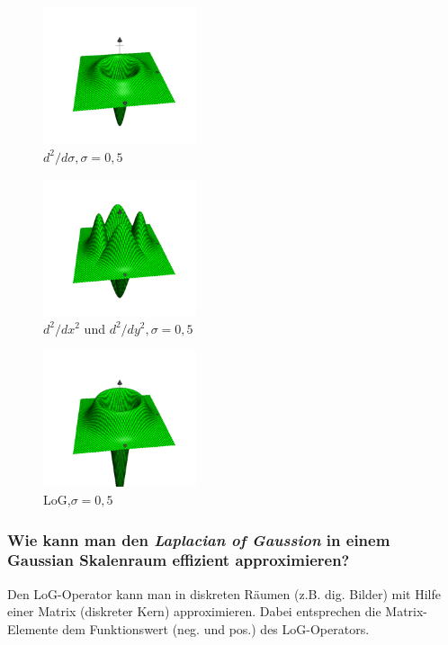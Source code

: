 \begin{figure}[p] %
   \centering
   \includegraphics[width=0.4\textwidth]{Uebung6/1Abl_sigma.pdf} 
   \caption{$d^{2}/d\sigma,\sigma=0,5$}
   \label{fig:1Abl}
\end{figure}

\begin{figure}[p] %
   \centering
   \includegraphics[width=0.4\textwidth]{Uebung6/2Abl_xy.pdf} 
   \caption{$d^{2}/dx^{2}$ und $d^{2}/dy^{2},\sigma=0,5$}
   \label{fig:2Abl}
\end{figure}

\begin{figure}[p] %
   \centering
   \includegraphics[width=0.4\textwidth]{Uebung6/LoG.pdf} 
   \caption{LoG,$\sigma=0,5$}
   \label{fig:LoG}
\end{figure}

\subsubsection*{Wie kann man den \emph{Laplacian of Gaussion} in einem Gaussian Skalenraum effizient approximieren?}

Den LoG-Operator kann man in diskreten R\"aumen (z.B. dig. Bilder) mit Hilfe einer Matrix (diskreter Kern) approximieren. Dabei entsprechen die Matrix-Elemente dem Funktionswert (neg. und pos.) des LoG-Operators.